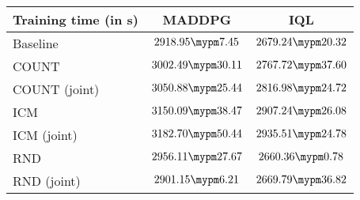 \begin{tabular}{l | c c}
	Training time (in s) & MADDPG & IQL\\ \toprule
		Baseline & $2918.95 \mypm 7.45$ & $2679.24 \mypm 20.32$ \\ \midrule
	COUNT & $3002.49 \mypm 30.11$ & $2767.72 \mypm 37.60$ \\
	COUNT (joint) & $3050.88 \mypm 25.44$ & $2816.98 \mypm 24.72$ \\\midrule
	ICM & $3150.09 \mypm 38.47$ & $2907.24 \mypm 26.08$ \\
	ICM (joint) & $3182.70 \mypm 50.44$ & $2935.51 \mypm 24.78$ \\\midrule
	RND & $2956.11 \mypm 27.67$ & $2660.36 \mypm 0.78$ \\
	RND (joint) & $2901.15 \mypm 6.21$ & $2669.79 \mypm 36.82$ \\\midrule
\end{tabular}
